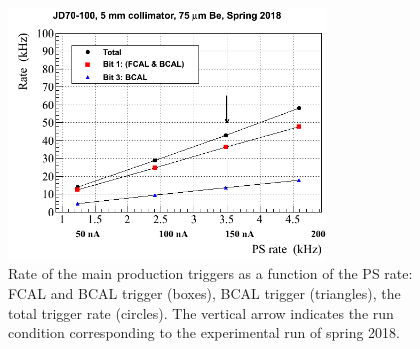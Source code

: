
\begin{figure}[tbp]
\begin{center}
\includegraphics[width=0.75\textwidth]{figures/Rate_diamond_2018.png}  
\caption{Rate of the main production triggers as a function of the PS rate: FCAL and BCAL trigger (boxes), BCAL trigger (triangles), the total trigger rate (circles). The vertical arrow indicates the run condition corresponding to the experimental run of spring 2018.} \label{fig:trig_rate}
\end{center}
\end{figure}
